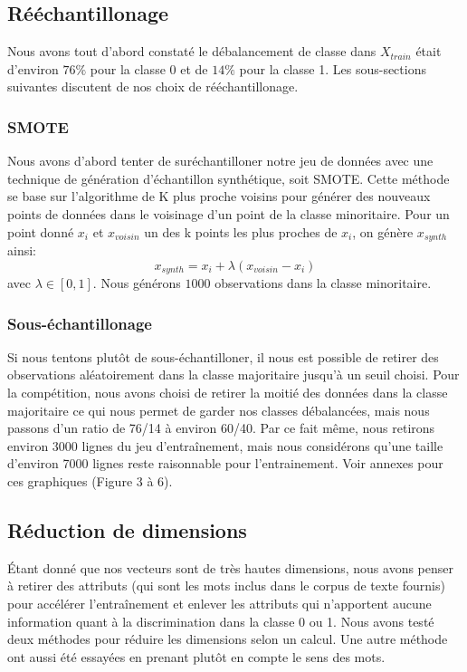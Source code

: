 \documentclass{article}
\begin{document}
\subsection{Rééchantillonage}
Nous avons tout d'abord constaté le débalancement de classe dans $X_{train}$ était d'environ $76\%$ pour la classe 0 et de $14\%$ pour la classe 1. Les sous-sections suivantes discutent de nos choix de rééchantillonage.
\subsubsection{SMOTE}
Nous avons d'abord tenter de suréchantilloner notre jeu de données avec une technique de génération d'échantillon synthétique, soit SMOTE. Cette méthode se base sur l'algorithme de K plus proche voisins pour générer des nouveaux points de données dans le voisinage d'un point de la classe minoritaire. Pour un point donné $x_i$ et $x_{voisin}$ un des k points les plus proches de $x_i$, on génère $x_{synth}$ ainsi:\\
$$x_{synth} = x_i + \lambda (x_{voisin} - x_i)$$ avec $\lambda \in [0, 1]$.
Nous générons $1000$ observations dans la classe minoritaire.
\subsubsection{Sous-échantillonage}
Si nous tentons plutôt de sous-échantilloner, il nous est possible de retirer des observations aléatoirement dans la classe majoritaire jusqu'à un seuil choisi. Pour la compétition, nous avons choisi de retirer la moitié des données dans la classe majoritaire ce qui nous permet de garder nos classes débalancées, mais nous passons d'un ratio de 76/14 à environ 60/40. Par ce fait même, nous retirons environ 3000 lignes du jeu d'entraînement, mais nous considérons qu'une taille d'environ 7000 lignes reste raisonnable pour l'entrainement. Voir annexes pour ces graphiques (Figure 3 à 6).
\subsection{Réduction de dimensions}
Étant donné que nos vecteurs sont de très hautes dimensions, nous avons penser à retirer des attributs (qui sont les mots inclus dans le corpus de texte fournis) pour accélérer l'entraînement et enlever les attributs qui n'apportent aucune information quant à la discrimination dans la classe 0 ou 1. Nous avons testé deux méthodes pour réduire les dimensions selon un calcul. Une autre méthode ont aussi été essayées en prenant plutôt en compte le sens des mots.
\end{document}
